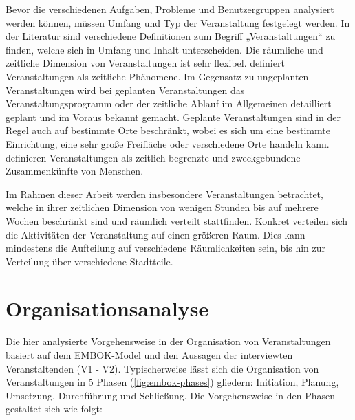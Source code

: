 Bevor die verschiedenen Aufgaben, Probleme und Benutzergruppen analysiert werden
können, müssen Umfang und Typ der Veranstaltung festgelegt werden. In der
Literatur sind verschiedene Definitionen zum Begriff „Veranstaltungen“ zu
finden, welche sich in Umfang und Inhalt unterscheiden. Die räumliche und
zeitliche Dimension von Veranstaltungen ist sehr flexibel. \textcite{Getz2007}
definiert Veranstaltungen als zeitliche Phänomene. Im Gegensatz zu ungeplanten
Veranstaltungen wird bei geplanten Veranstaltungen das Veranstaltungsprogramm
oder der zeitliche Ablauf im Allgemeinen detailliert geplant und im Voraus
bekannt gemacht. Geplante Veranstaltungen sind in der Regel auch auf bestimmte
Orte beschränkt, wobei es sich um eine bestimmte Einrichtung, eine sehr große
Freifläche oder verschiedene Orte handeln kann. \textcite{Bladen2012} definieren
Veranstaltungen als zeitlich begrenzte und zweckgebundene Zusammenkünfte von
Menschen.

Im Rahmen dieser Arbeit werden insbesondere Veranstaltungen betrachtet, welche
in ihrer zeitlichen Dimension von wenigen Stunden bis auf mehrere Wochen
beschränkt sind und räumlich verteilt stattfinden. Konkret verteilen sich die
Aktivitäten der Veranstaltung auf einen größeren Raum. Dies kann mindestens die
Aufteilung auf verschiedene Räumlichkeiten sein, bis hin zur Verteilung über
verschiedene Stadtteile.


\section{Organisationsanalyse} \label{sec:analysis-org}

Die hier analysierte Vorgehensweise in der Organisation von Veranstaltungen
basiert auf dem EMBOK-Model \cite{Silvers2013} und den Aussagen der interviewten
Veranstaltenden (V1 - V2). Typischerweise lässt sich die Organisation von
Veranstaltungen in 5 Phasen (\autoref{fig:embok-phases}) gliedern: Initiation,
Planung, Umsetzung, Durchführung und Schließung. Die Vorgehensweise in den
Phasen gestaltet sich wie folgt:

\newpage

